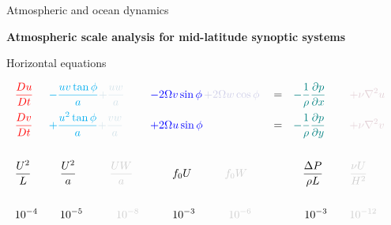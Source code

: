 \documentclass[aspectratio=169,xcolor=dvipsnames]{beamer}
\newcommand{\graylevel}{90} %
\newcommand{\textcolorg}[2]{%
  \textcolor{verylightgray!\graylevel!#1}{#2}%
}
\begin{document}
\begin{frame}[t]{Atmospheric and ocean dynamics}

\vspace{-1.0em}

\begin{center}
\textbf{{\large
Atmospheric scale analysis for mid-latitude synoptic systems
}}
\end{center}

\small 
\center 

\vspace{-0.5em}

Horizontal equations

\begin{align*}
    &\textcolor{red}{    \frac{Du}{Dt}   }&
    &\textcolor{cyan}{   - \frac{uv \tan\phi}{a} }
     \textcolorg{cyan}{  + \frac{uw}{a}  }& 
    & \textcolor{blue}{   - 2\Omega v \sin\phi }
     \textcolorg{blue}{  \,+ 2\Omega w \cos\phi }&
    & = &
    &\textcolor{teal}{   -\frac{1}{\rho}\frac{\partial p}{\partial x}  }&
    & \textcolorg{purple}{\quad + \nu \nabla^2 u }&
    \\
    &\textcolor{red}{    \frac{Dv}{Dt}   } &
    &\textcolor{cyan}{   + \frac{u^2 \tan\phi}{a} }
     \textcolorg{cyan}{  + \frac{vw}{a}     }&
    & \textcolor{blue}{   + 2\Omega u \sin\phi    }&
    & = &
    &\textcolor{teal}{   -\frac{1}{\rho}\frac{\partial p}{\partial y}  }&
    & \textcolorg{purple}{\quad + \nu \nabla^2 v }&
    \\ \\
      &\textcolor{black}{ \frac{U^2}{L}  }&
      &\textcolor{black}{ \quad \frac{U^2}{a} }
       \textcolorg{black}{\quad\quad\quad\frac{UW}{a} }&
      &\textcolor{black}{ \quad\quad f_0 U      }
       \textcolorg{black}{\quad\quad\quad f_0 W  }&
      &&
      &\textcolor{black}{ \,\,\,\,\,\frac{\Delta P}{\rho L}  }&
      &\textcolorg{black}{ \quad\frac{\nu U}{H^2} }&
    \\ \\
      &\textcolor{black}{ 10^{-4} }&
      &\textcolor{black}{  \quad10^{-5} }
       \textcolorg{black}{ \quad\quad\quad 10^{-8}  }&
      &\textcolor{black}{  \quad\quad10^{-3}        }
       \textcolorg{black}{ \quad\quad\quad 10^{-6} }&
      &&
      &\textcolor{black}{ \quad10^{-3}  }&
      &\textcolorg{black}{ \quad10^{-12} }&
\end{align*}

\end{frame}
\end{document}

